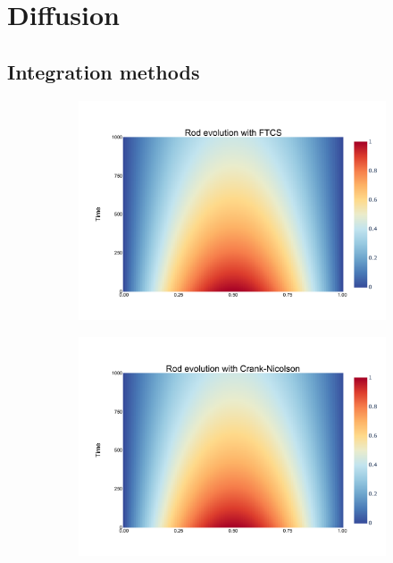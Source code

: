 \documentclass[
	a4paper, %
	10pt, %
]{CSUniSchoolLabReport}
\begin{document}
\section{Diffusion}

\subsection{Integration methods}

\begin{figure}[H]
	\centering
	\begin{subfigure}[b]{0.49\textwidth}
		\includegraphics[width=\textwidth]{../saves_t2/rod_FTCS.pdf}
	\end{subfigure}
	\hfill
	\begin{subfigure}[b]{0.49\textwidth}
		\includegraphics[width=\textwidth]{../saves_t2/rod_crank-nic.pdf}

\end{subfigure}
\end{figure}
\end{document}
